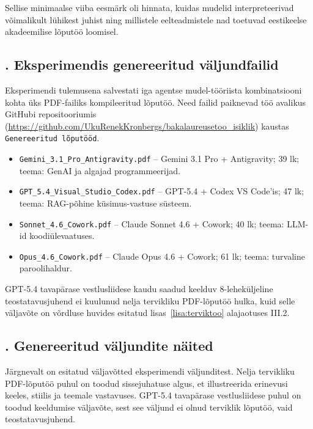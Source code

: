 Sellise minimaalse viiba eesmärk oli hinnata, kuidas mudelid interpreteerivad võimalikult lühikest juhist ning millistele eelteadmistele nad toetuvad eestikeelse akadeemilise lõputöö loomisel.

\subsection*{\thelisa. Eksperimendis genereeritud väljundfailid} \label{lisa:valjundfailid} 

Eksperimendi tulemusena salvestati iga agentse mudel-tööriista kombinatsiooni kohta üks PDF-failiks kompileeritud lõputöö. Need failid paiknevad töö avalikus GitHubi repositooriumis (\url{https://github.com/UkuRenekKronbergs/bakalaureusetoo_isiklik}) kaustas \texttt{Genereeritud lõputööd}.

\begin{itemize}
    \item \texttt{Gemini\_3.1\_Pro\_Antigravity.pdf} -- Gemini 3.1 Pro + Antigravity; 39 lk; teema: GenAI ja algajad programmeerijad.
    \item \texttt{GPT\_5.4\_Visual\_Studio\_Codex.pdf} -- GPT-5.4 + Codex VS Code'is; 47 lk; teema: RAG-põhine küsimus-vastuse süsteem.
    \item \texttt{Sonnet\_4.6\_Cowork.pdf} -- Claude Sonnet 4.6 + Cowork; 40 lk; teema: LLM-id koodiülevaatuses.
    \item \texttt{Opus\_4.6\_Cowork.pdf} -- Claude Opus 4.6 + Cowork; 61 lk; teema: turvaline paroolihaldur.
\end{itemize}

GPT-5.4 tavapärase vestlusliidese kaudu saadud keelduv 8-leheküljeline teostatavusjuhend ei kuulunud nelja tervikliku PDF-lõputöö hulka, kuid selle väljavõte on võrdluse huvides esitatud lisas~\ref{lisa:terviktoo} alajaotuses III.2.

\subsection*{\thelisa. Genereeritud väljundite näited} \label{lisa:terviktoo} 

Järgnevalt on esitatud väljavõtted eksperimendi väljunditest. Nelja tervikliku PDF-lõputöö puhul on toodud sissejuhatuse algus, et illustreerida erinevusi keeles, stiilis ja teemale vastavuses. GPT-5.4 tavapärase vestlusliidese puhul on toodud keeldumise väljavõte, sest see väljund ei olnud terviklik lõputöö, vaid teostatavusjuhend.

